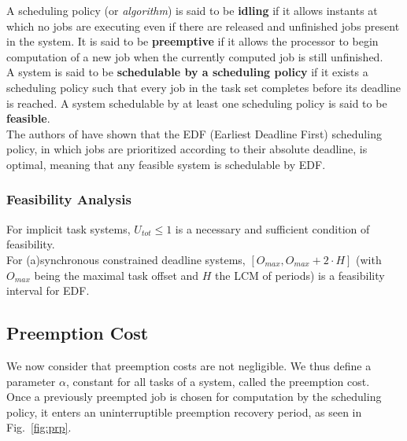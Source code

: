 \documentclass[a4paper,10pt]{article}
\begin{document}
        A scheduling policy (or \emph{algorithm}) is said to be \textbf{idling} if it allows instants at which no jobs are executing even if there are released and unfinished jobs present in the system. It is said to be \textbf{preemptive} if it allows the processor to begin computation of a new job when the currently computed job is still unfinished.\\

        A system is said to be \textbf{schedulable by a scheduling policy} if it exists a scheduling policy such that every job in the task set completes before its deadline is reached. A system schedulable by at least one scheduling policy is said to be \textbf{feasible}.\\

        The authors of \cite{liu1973scheduling} have shown that the EDF (Earliest Deadline First) scheduling policy, in which jobs are prioritized according to their absolute deadline, is optimal, meaning that any feasible system is schedulable by EDF.\\

        \subsubsection{Feasibility Analysis}

        For implicit task systems, $U_{tot} \leqslant 1$ is a necessary and sufficient condition of feasibility.\\

        For (a)synchronous constrained deadline systems, $[O_{max}, O_{max} + 2 \cdot H]$ (with $O_{max}$ being the maximal task offset and $H$ the LCM of periods) is a feasibility interval for EDF.

    \subsection{Preemption Cost}

        We now consider that preemption costs are not negligible. We thus define a parameter $\alpha$, constant for all tasks of a system, called the preemption cost.\\

        Once a previously preempted job is chosen for computation by the scheduling policy, it enters an uninterruptible preemption recovery period, as seen in Fig.~\ref{fig:prp}.\\
\end{document}
